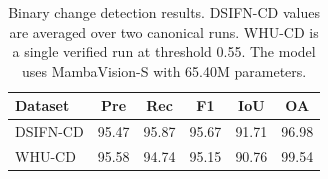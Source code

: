 \begin{table}[t]
\centering
\caption{Binary change detection results. DSIFN-CD values are averaged over two canonical runs. WHU-CD is a single verified run at threshold 0.55. The model uses MambaVision-S with 65.40M parameters.}
\label{tab:main_results}
\begin{tabular}{lccccc}
\toprule
Dataset & Pre & Rec & F1 & IoU & OA \\
\midrule
DSIFN-CD & 95.47 & 95.87 & 95.67 & 91.71 & 96.98 \\
WHU-CD   & 95.58 & 94.74 & 95.15 & 90.76 & 99.54 \\
\bottomrule
\end{tabular}
\end{table}
